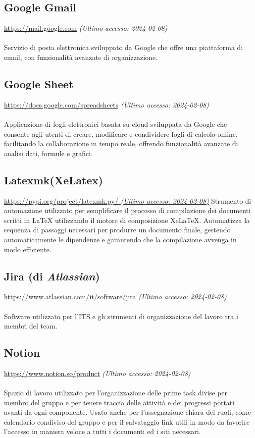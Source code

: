 \documentclass[10pt, a4paper]{article}
\begin{document}
\subsection{Google Gmail}
\href{https://mail.google.com}{https://mail.google.com} \textit{(Ultimo accesso: 2024-02-08)}\\\\
Servizio di posta elettronica sviluppato da Google che offre una piattaforma di email, con funzionalità avanzate di organizzazione.

\subsection{Google Sheet}
\href{https://docs.google.com/spreadsheets}{https://docs.google.com/spreadsheets} \textit{(Ultimo accesso: 2024-02-08)}\\\\
Applicazione di fogli elettronici basata su cloud sviluppata da Google che consente agli utenti di creare, modificare e condividere fogli di calcolo online, facilitando la 
collaborazione in tempo reale, offrendo funzionalità avanzate di analisi dati, formule e grafici.

\subsection{Latexmk(XeLatex)}
\href{https://pypi.org/project/latexmk.py/}{https://pypi.org/project/latexmk.py/ \textit{(Ultimo accesso: 2024-02-08)}}
Strumento di automazione utilizzato per semplificare il processo di compilazione dei documenti scritti in LaTeX utilizzando il motore di composizione XeLaTeX. Automatizza 
la sequenza di passaggi necessari per produrre un documento finale, gestendo automaticamente le dipendenze e garantendo che la compilazione avvenga in modo efficiente.


\subsection{Jira (di \textit{Atlassian})}
\href{https://www.atlassian.com/it/software/jira}{https://www.atlassian.com/it/software/jira} \textit{(Ultimo accesso: 2024-02-08)}\\\\
Software utilizzato per l'ITS e gli strumenti di organizzazione del lavoro tra i membri del team.

\subsection{Notion}
\href{https://www.notion.so/product}{https://www.notion.so/product} \textit{(Ultimo accesso: 2024-02-08)}\\\\
Spazio di lavoro utilizzato per l'organizzazione delle prime task divise per membro del gruppo e per tenere traccia delle attività e dei progressi portati avanti da ogni componente. Usato anche per l'assegnazione chiara dei ruoli, come calendario condiviso del gruppo e per il salvataggio link utili in modo da favorire l'accesso in maniera veloce a tutti i documenti ed i siti necessari.
\end{document}
